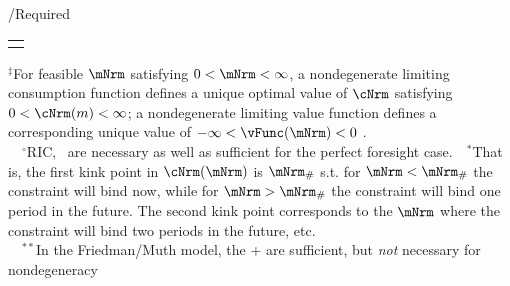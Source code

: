 \documentclass[\econtexRoot/BufferStockTheory]{subfiles}
\providecommand{\TblName}{}
\renewcommand{\TblName}{Required}
\begin{document}
\begin{verbatimwrite}{\TableDir/\TblName}
\begin{table}
{\begin{tabular}{|l|l|l|}
        \\ \hline \multicolumn{3}{c}{}
      \end{tabular}
    } %

    \settowidth\TableWidth{\usebox{\Tbl}}
    \savebox{\TblShrunkBox}{
      \settowidth{\TblShrunk}{\usebox{\Tbl}}
      \resizebox{\textwidth}{!}{\begin{minipage}{\TblShrunk}
          \usebox{\Tbl}
        \end{minipage}}
    }

    \usebox{\TblShrunkBox}


    \parbox{\textwidth}{\footnotesize         $^{\ddagger}$For feasible $\mNrm$ satisfying $0 < \mNrm < \infty$, a nondegenerate limiting consumption function defines a unique optimal value of $\cNrm$ satisfying $0 < \cNrm(m) < \infty$; a nondegenerate limiting value function defines a corresponding unique value of $-\infty < \vFunc(\mNrm) < 0$ .\\
      ~~$^{\circ}$RIC, \FHWC~are necessary as well as sufficient for the perfect foresight case.~~$^{\ast}$That is, the first kink point in $\cNrm(\mNrm)$ is $\mNrm_{\#}$ s.t. for $\mNrm < \mNrm_{\#}$ the constraint will bind now, while for $\mNrm > \mNrm_{\#}$ the constraint will bind one period in the future.  The second kink point corresponds to the $\mNrm$ where the constraint will bind two periods in the future, etc.\\
      ~~$^{\ast\ast}$In the Friedman/Muth model, the {\RIC}+{\FHWC} are sufficient, but \textit{not} necessary for nondegeneracy} 
  \end{table}
  
\end{verbatimwrite}
\clearpage

\end{document}
